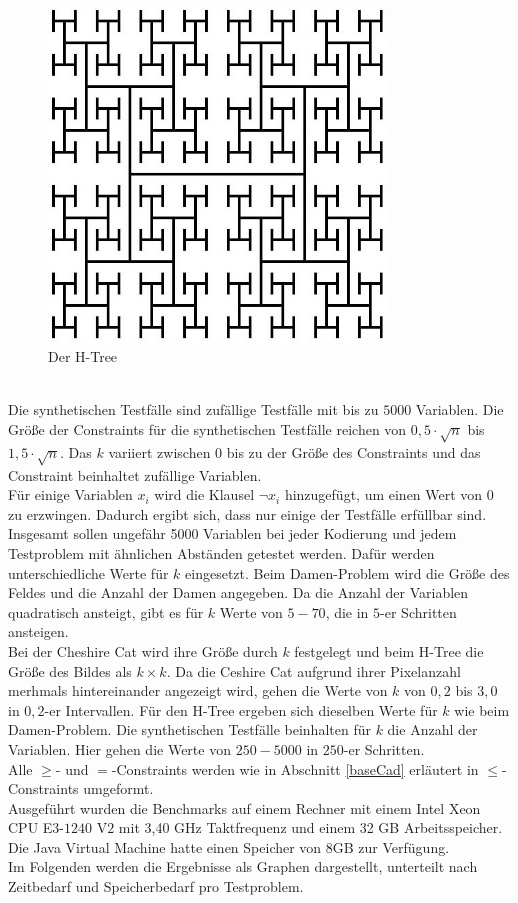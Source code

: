 \documentclass[a4,abstract=on]{scrartcl}
\begin{document}
\begin{figure}[H]
\centering
\includegraphics[width=9cm]{htree.png}
\caption{Der H-Tree}
\label{fig:htree}
\end{figure}
\ \\
Die synthetischen Testfälle sind zufällige Testfälle mit bis zu $5000$ Variablen. Die Größe der Constraints für die synthetischen Testfälle reichen von $0,5\cdot \sqrt{n}$ bis $1,5\cdot \sqrt{n}$. Das $k$ variiert zwischen $0$ bis zu der Größe des Constraints und das Constraint beinhaltet zufällige Variablen.\\
Für einige Variablen $x_i$ wird die Klausel $\neg x_i$ hinzugefügt, um einen Wert von $0$ zu erzwingen. Dadurch ergibt sich, dass nur einige der Testfälle erfüllbar sind.\\
Insgesamt sollen ungefähr 5000 Variablen bei jeder Kodierung und jedem Testproblem mit ähnlichen Abständen getestet werden. Dafür werden unterschiedliche Werte für $k$ eingesetzt. Beim Damen-Problem wird die Größe des Feldes und die Anzahl der Damen angegeben. Da die Anzahl der Variablen quadratisch ansteigt, gibt es für $k$ Werte von $5-70$, die in $5$-er Schritten ansteigen.\\
Bei der Cheshire Cat wird ihre Größe durch $k$ festgelegt und beim H-Tree die Größe des Bildes als $k \times k$. Da die Ceshire Cat aufgrund ihrer Pixelanzahl merhmals hintereinander angezeigt wird, gehen die Werte von $k$ von $0,2$ bis $3,0$ in $0,2$-er Intervallen. Für den H-Tree ergeben sich dieselben Werte für $k$ wie beim Damen-Problem.
Die synthetischen Testfälle beinhalten für $k$ die Anzahl der Variablen. Hier gehen die Werte von $250-5000$ in $250$-er Schritten.\\
Alle $\geq$- und $=$-Constraints werden wie in Abschnitt \ref{baseCad} erläutert in $\leq$-Constraints umgeformt.\\
Ausgeführt wurden die Benchmarks auf einem Rechner mit einem Intel Xeon CPU E$3$-$1240$ V$2$ mit 3,40 GHz Taktfrequenz und einem 32 GB Arbeitsspeicher. Die Java Virtual Machine hatte einen Speicher von 8GB zur Verfügung.\\
Im Folgenden werden die Ergebnisse als Graphen dargestellt, unterteilt nach Zeitbedarf und Speicherbedarf pro Testproblem.
\end{document}
